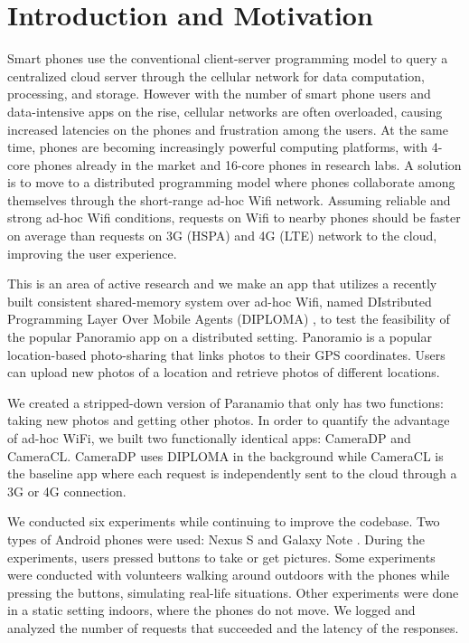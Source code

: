 \chapter{Introduction and Motivation}

Smart phones use the conventional client-server programming model to query a centralized cloud server through the cellular network for data computation, processing, and storage. However with the number of smart phone users and data-intensive apps on the rise, cellular networks are often overloaded, causing increased latencies on the phones and frustration among the users. At the same time, phones are becoming increasingly powerful computing platforms, with 4-core phones already in the market and 16-core phones in research labs. A solution is to move to a distributed programming model where phones collaborate among themselves through the short-range ad-hoc Wifi network.  Assuming reliable and strong ad-hoc Wifi conditions, requests on Wifi to nearby phones should be faster on average than requests on 3G (HSPA) and 4G (LTE) network to the cloud, improving the user experience. 

This is an area of active research and we make an app that utilizes a recently built consistent shared-memory system over ad-hoc Wifi, named DIstributed Programming Layer Over Mobile Agents (DIPLOMA) \cite{diploma}, to test the feasibility of the popular Panoramio \cite{Panoramio} app on a distributed setting. Panoramio is a popular location-based photo-sharing that links photos to their GPS coordinates. Users can upload new photos of a location and retrieve photos of different locations.

We created a stripped-down version of Paranamio that only has two functions: taking new photos and getting other photos. In order to quantify the advantage of ad-hoc WiFi, we built two functionally identical apps: CameraDP and CameraCL. CameraDP uses DIPLOMA in the background while CameraCL is the baseline app where each request is independently sent to the cloud through a 3G or 4G connection.

We conducted six experiments while continuing to improve the codebase. Two types of Android phones were used: Nexus S \cite{nexus} and Galaxy Note \cite{galaxy}. During the experiments, users pressed buttons to take or get pictures. Some experiments were conducted with volunteers walking around outdoors with the phones while pressing the buttons, simulating real-life situations. Other experiments were done in a static setting indoors, where the phones do not move. We logged and analyzed the number of requests that succeeded and the latency of the responses.

